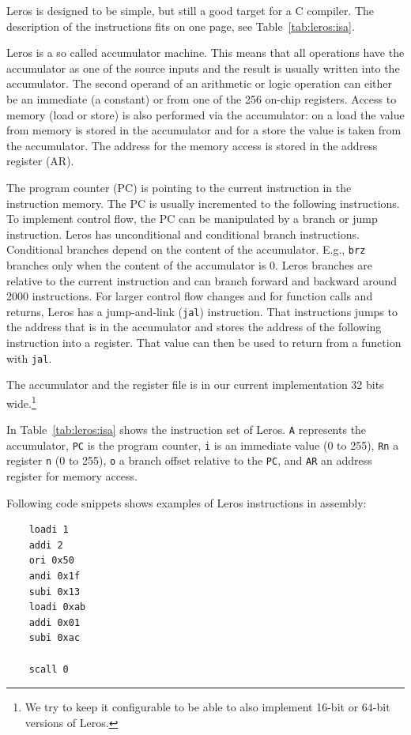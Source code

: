 \documentclass[%
    10pt,
    headinclude, footexclude,
    openright, %
    notitlepage,
    cleardoubleempty,
    headsepline,
    pointlessnumbers,
    bibtotoc, idxtotoc,
    ]{scrbook}
\newcommand{\code}[1]{{\small{\texttt{#1}}}}
\begin{document}
Leros is designed to be simple, but still a good target for a C compiler.
The description of the instructions fits on one page, see Table~\ref{tab:leros:isa}.

Leros is a so called accumulator machine. This means that all operations
have the accumulator as one of the source inputs and the result is usually
written into the accumulator. The second operand of an arithmetic or logic
operation can either be an immediate (a constant) or from one of the 256
on-chip registers. Access to memory (load or store) is also performed via
the accumulator: on a load the value from memory is stored in the accumulator
and for a store the value is taken from the accumulator. The address for the
memory access is stored in the address register (AR).

The program counter (PC) is pointing to the current instruction in the
instruction memory. The PC is usually incremented to the following instructions.
To implement control flow, the PC can be manipulated by a branch
or jump instruction.
Leros has unconditional and conditional branch instructions.
Conditional branches depend on the content of the accumulator.
E.g., \code{brz} branches only when the content of the accumulator is 0.
Leros branches are relative to the current instruction and can branch forward
and backward around 2000 instructions.
For larger control flow changes and for function calls and returns,
Leros has a jump-and-link (\code{jal}) instruction.
That instructions jumps to the address that is in the accumulator and
stores the address of the following instruction into a register.
That value can then be used to return from a function with \code{jal}.

The accumulator and the register file is in our current implementation
32 bits wide.\footnote{We try to keep it configurable to be able to also
implement 16-bit or 64-bit versions of Leros.}


In Table~\ref{tab:leros:isa} shows the instruction set of Leros.
\code{A} represents the accumulator, \code{PC} is the program counter,
\code{i} is an immediate value (0 to 255), \code{Rn} a register
\code{n} (0 to 255), \code{o} a branch offset relative to the \code{PC},
and \code{AR} an address register for memory access.

Following code snippets shows examples of Leros instructions in assembly:

\begin{verbatim}
	loadi 1
	addi 2
	ori 0x50
	andi 0x1f
	subi 0x13
	loadi 0xab
	addi 0x01
	subi 0xac

	scall 0
\end{verbatim}
\end{document}
